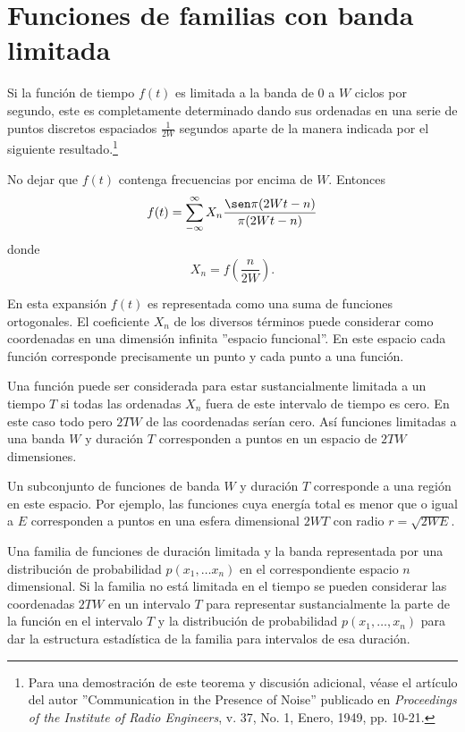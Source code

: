 \section{Funciones de familias con banda limitada}

Si la funci\'on de tiempo $f(t)$ es limitada a la banda de 0 a $W$
ciclos por segundo, este es completamente determinado dando sus
ordenadas en una serie de puntos discretos espaciados $\frac{1}{2W}$
segundos aparte de la manera indicada por el siguiente
resultado.\footnote[5]{Para una demostraci\'on de este teorema y
discusi\'on adicional, v\'ease el art\'iculo del autor ''Communication
in the Presence of Noise'' publicado en {\em Proceedings of the
Institute of Radio Engineers}, v. 37, No. 1, Enero, 1949, pp. 10-21.}

\begin{theorem}
No dejar que $f(t)$ contenga frecuencias por encima de $W$.  Entonces
\begin{equation}
  f(t) = \sum_{-\infty}^{\infty} X_n \frac{\sen \pi(2Wt-n)}{\pi(2Wt-n)}
\end{equation}
donde
\begin{equation}
  X_n = f\left(\frac{n}{2W} \right).
\end{equation}
\end{theorem}


En esta expansi\'on $f(t)$ es representada como una suma de funciones
ortogonales. El coeficiente $X_n$ de los diversos t\'erminos puede
considerar como coordenadas en una dimensi\'on infinita ''espacio
funcional''. En este espacio cada funci\'on corresponde precisamente
un punto y cada punto a una funci\'on.

Una funci\'on puede ser considerada para estar sustancialmente
limitada a un tiempo $T$ si todas las ordenadas $X_n$ fuera de este
intervalo de tiempo es cero. En este caso todo pero $2TW$ de las
coordenadas ser\'ian cero. As\'i funciones limitadas a una banda $W$ y
duraci\'on $T$ corresponden a puntos en un espacio de $2TW$
dimensiones.

Un subconjunto de funciones de banda $W$ y duraci\'on $T$ corresponde
a una regi\'on en este espacio. Por ejemplo, las funciones cuya
energ\'ia total es menor que o igual a $E$ corresponden a puntos en
una esfera dimensional $2WT$ con radio $r=\sqrt{2WE}$.

Una familia de funciones de duraci\'on limitada y la banda
representada por una distribuci\'on de probabilidad $p(x_1, \ldots
x_n)$ en el correspondiente espacio $n$ dimensional. Si la familia no
est\'a limitada en el tiempo se pueden considerar las coordenadas
$2TW$ en un intervalo $T$ para representar sustancialmente la parte de
la funci\'on en el intervalo $T$ y la distribuci\'on de probabilidad
$p(x_1, \ldots, x_n)$ para dar la estructura estad\'istica de la familia
para intervalos de esa duraci\'on.

